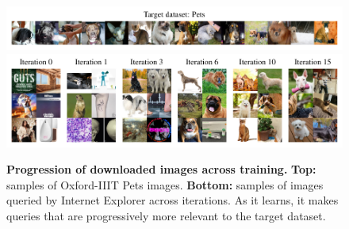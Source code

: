 \begin{figure}[t]
\centering
\includegraphics[width=\linewidth]{figures/pets_targets.pdf}\\
\vspace{-0.1in}
\includegraphics[width=\linewidth]{figures/pets-progression-962-2col-3row.pdf}
\vspace{-0.28in}
\caption{
\textbf{Progression of downloaded images across training.} \textbf{Top:} samples of Oxford-IIIT Pets images. \textbf{Bottom:} samples of images queried by Internet Explorer across iterations. As it learns, it makes queries that are progressively more relevant to the target dataset.
}
\label{fig:progression}
\vspace{-0.15in}
\end{figure}

